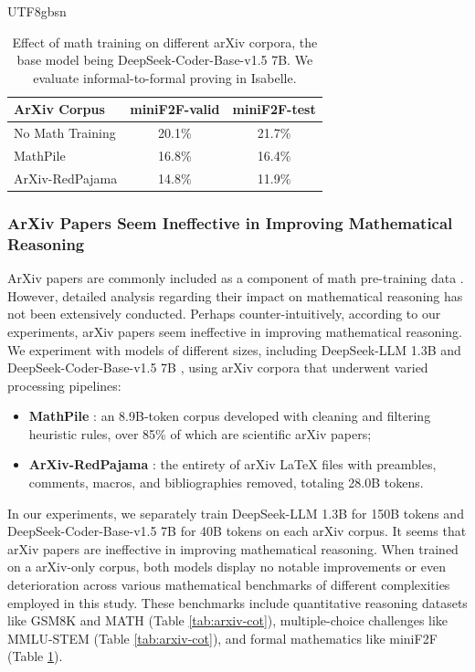 \documentclass[11pt, a4paper, logo, copyright, nonumbering]{deepseek}
\begin{document}
\begin{CJK*}{UTF8}{gbsn}
\begingroup
\setlength{\tabcolsep}{3pt} %
\renewcommand{\arraystretch}{1} %

\begin{table}[t!]
    \centering
\begin{small}
\begin{tabular}{lcc} 
\toprule
ArXiv Corpus      & miniF2F-valid & miniF2F-test  \\ 
\midrule
No Math Training &   20.1\%        & 21.7\%            \\ 
\midrule
MathPile         & 16.8\%        & 16.4\%        \\
ArXiv-RedPajama  & 14.8\%        & 11.9\%        \\
\bottomrule
\end{tabular}
\end{small}
    \caption{
    Effect of math training on different arXiv corpora, the base model being DeepSeek-Coder-Base-v1.5 7B.
    We evaluate informal-to-formal proving in Isabelle.
    }
    \label{tab:arxiv_atp}
    \vspace{-0.1in}
\end{table}
\endgroup

\subsubsection{ArXiv Papers Seem Ineffective in Improving Mathematical Reasoning}

ArXiv papers are commonly included as a component of math pre-training data \citep{minerva,gpt-f,llemma,mathpile}.
However, detailed analysis regarding their impact on mathematical reasoning has not been extensively conducted.
Perhaps counter-intuitively, according to our experiments, arXiv papers seem ineffective in improving mathematical reasoning.
We experiment with models of different sizes, including DeepSeek-LLM 1.3B and DeepSeek-Coder-Base-v1.5 7B \citep{deepseek-coder}, using arXiv corpora that underwent varied processing pipelines:
\begin{itemize}[topsep=0pt]
    \item \textbf{MathPile} \citep{mathpile}:
    an 8.9B-token corpus developed with cleaning and filtering heuristic rules, over 85\% of which are scientific arXiv papers;
    \item \textbf{ArXiv-RedPajama} \citep{redpajama}:
    the entirety of arXiv LaTeX files with preambles, comments, macros, and bibliographies removed, totaling 28.0B tokens.
\end{itemize}
\noindent
In our experiments, we separately train DeepSeek-LLM 1.3B for 150B tokens and DeepSeek-Coder-Base-v1.5 7B for 40B tokens on each arXiv corpus. It seems that arXiv papers are ineffective in improving mathematical reasoning.
When trained on a arXiv-only corpus, both models display no notable improvements or even deterioration across various mathematical benchmarks of different complexities employed in this study.
These benchmarks include quantitative reasoning datasets like GSM8K and MATH (Table \ref{tab:arxiv-cot}), multiple-choice challenges like MMLU-STEM (Table \ref{tab:arxiv-cot}), and formal mathematics like miniF2F (Table \ref{tab:arxiv_atp}).


\end{CJK*}
\end{document}
